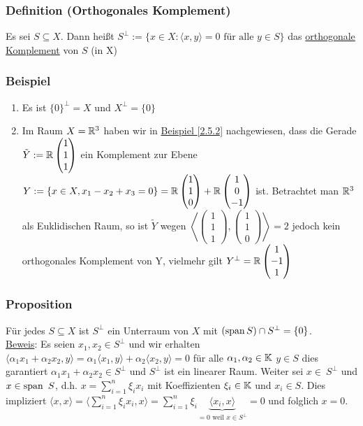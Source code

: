 \subsubsection{Definition (Orthogonales Komplement)}
Es sei $S \subseteq X$. Dann heißt $S^\bot:=\{x\in X\colon\langle x,y \rangle =0\text{ für alle }y\in S\}$
 das \underline{orthogonale Komplement} von $S$ (in X)
\subsubsection{Beispiel}
\numbers
\begin{enumerate}
\item Es ist $\{0\}^\bot=X$ und $X^{\bot}=\{0\}$
\item Im Raum $X=\mathbb{R}^3$ haben wir in \hyperref[2.5.2]{Beispiel \ref*{2.5.2}} nachgewiesen, dass die Gerade $\tilde{Y}:=\mathbb{R}\begin{pmatrix}1 \\1 \\1\end{pmatrix}$ ein Komplement zur Ebene $Y:=\{x\in X, x_1-x_2+x_3=0\}=\mathbb{R}\begin{pmatrix}1\\1\\0\end{pmatrix}+\mathbb{R}\begin{pmatrix}1\\0\\-1\end{pmatrix}$ ist.
Betrachtet man $\mathbb{R}^3$ als Euklidischen Raum, so ist $\tilde{Y}$ wegen $\left\langle \begin{pmatrix}1 \\1 \\1\end{pmatrix},\begin{pmatrix}1 \\1 \\0\end{pmatrix}\right\rangle=2$ jedoch kein orthogonales Komplement von Y, vielmehr gilt $Y^{\bot}=\mathbb{R}\begin{pmatrix}1 \\-1 \\1\end{pmatrix}$
\end{enumerate}
\subsubsection{Proposition}
\label{5.1.9}
Für jedes $S\subseteq X$ ist $S^{\bot}$ ein Unterraum von $X$ mit $(\operatorname{span} S)\cap S^{\bot}=\{0\}$.\\
\underline{Beweis}: Es seien $x_1,x_2\in S^{\bot}$ und wir erhalten $\langle \alpha_1 x_1+\alpha_2 x_2,y\rangle=\alpha_1\langle x_1,y\rangle+\alpha_2\langle x_2,y\rangle=0$ für alle $\alpha_1,\alpha_2\in\mathbb{K}$ $y\in S$ dies garantiert $\alpha_1 x_1+\alpha_2 x_2\in S^{\bot}$ und $S^{\bot}$ ist ein linearer Raum.
Weiter sei $x\in\ S^{\bot}$ und $x\in \operatorname{span} ~S$, d.h. $x=\sum_{i=1}^n \xi_i x_i$ mit Koeffizienten $\xi_i\in \mathbb{K}$ und $x_i\in S$. Dies impliziert $\langle x,x\rangle=\langle \sum_{i=1}^n \xi_i x_i,x\rangle=\sum_{i=1}^n\xi_i \underbrace{\langle x_i,x\rangle}_{=0\text{ weil }x\in S^{\bot}}=0$ und folglich $x=0$.
